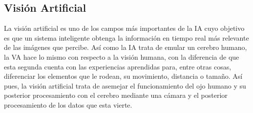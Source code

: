 \subsection{Visión Artificial}
\label{sec:subseccion}
La visión artificial es uno de los campos más importantes de la IA cuyo objetivo es que un sistema inteligente obtenga la información en tiempo real más relevante de las imágenes que percibe. Así como la IA trata de emular un cerebro humano, la VA hace lo mismo con respecto a la visión humana, con la diferencia de que esta segunda cuenta con las experiencias aprendidas para, entre otras cosas, diferenciar los elementos que le rodean, su movimiento, distancia o tamaño. Así pues, la visión artificial trata de asemejar el funcionamiento del ojo humano y su posterior procesamiento con el cerebro mediante  una cámara y el posterior procesamiento de los datos que esta vierte.\\


